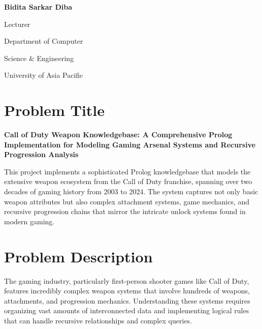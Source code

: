 \documentclass[12pt,a4paper]{article}
\begin{document}
\begin{titlepage}
\begin{minipage}[t]{0.45\textwidth}
        \vspace{0.5cm}

        {\large\bfseries Bidita Sarkar Diba}

        \vspace{0.3cm}

        {\large Lecturer}

        \vspace{0.3cm}

        {\large Department of Computer}

        \vspace{0.3cm}

        {\large Science \& Engineering}

        \vspace{0.3cm}

        {\large University of Asia Pacific}
    \end{minipage}

    \vfill

\end{titlepage}


\tableofcontents
\newpage

\setcounter{page}{1}

\section{Problem Title}

\textbf{Call of Duty Weapon Knowledgebase: A Comprehensive Prolog Implementation for Modeling Gaming Arsenal Systems and Recursive Progression Analysis}

This project implements a sophisticated Prolog knowledgebase that models the
extensive weapon ecosystem from the Call of Duty franchise, spanning over two
decades of gaming history from 2003 to 2024. The system captures not only basic
weapon attributes but also complex attachment systems, game mechanics, and
recursive progression chains that mirror the intricate unlock systems found in
modern gaming.

\section{Problem Description}

The gaming industry, particularly first-person shooter games like Call of Duty,
features incredibly complex weapon systems that involve hundreds of weapons,
attachments, and progression mechanics. Understanding these systems requires
organizing vast amounts of interconnected data and implementing logical rules
that can handle recursive relationships and complex queries.
\end{document}
